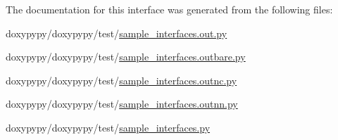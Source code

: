 The documentation for this interface was generated from the following files\-:\begin{DoxyCompactItemize}
\item 
doxypypy/doxypypy/test/\hyperlink{sample__interfaces_8out_8py}{sample\-\_\-interfaces.\-out.\-py}\item 
doxypypy/doxypypy/test/\hyperlink{sample__interfaces_8outbare_8py}{sample\-\_\-interfaces.\-outbare.\-py}\item 
doxypypy/doxypypy/test/\hyperlink{sample__interfaces_8outnc_8py}{sample\-\_\-interfaces.\-outnc.\-py}\item 
doxypypy/doxypypy/test/\hyperlink{sample__interfaces_8outnn_8py}{sample\-\_\-interfaces.\-outnn.\-py}\item 
doxypypy/doxypypy/test/\hyperlink{sample__interfaces_8py}{sample\-\_\-interfaces.\-py}\end{DoxyCompactItemize}
